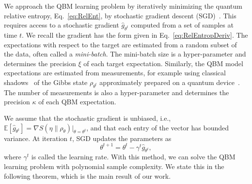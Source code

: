 \documentclass[
    aps,
    prx,
    onecolumn
]{revtex4-2}
\begin{document}
We approach the QBM learning problem by iteratively minimizing the quantum relative entropy,  Eq.~\eqref{eq:RelEnt}, by stochastic gradient descent (SGD)~\cite{Garrigos2023}. This requires access to a stochastic gradient $\hat{g}_{\theta^t}$ computed from a set of samples at time $t$. We recall the gradient has the form given in Eq.~\eqref{eq:RelEntropDeriv}. The expectations with respect to the target are estimated from a random subset of the data, often called a \emph{mini-batch}. The mini-batch size is a hyper-parameter and determines the precision $\xi$ of each target expectation. Similarly, the QBM model expectations are estimated from measurements, for example using classical shadows~\cite{Aaronson_2017, Huang_2021} of the Gibbs state $\rho_{\theta^t}$ approximately prepared on a quantum device~\cite{Coopmans_2023}. The number of measurements is also a hyper-parameter and determines the precision $\kappa$ of each QBM expectation.

We assume that the stochastic gradient is unbiased, i.e., $\mathbb{E}[\hat{g}_{\theta^t}] = \nabla S(\eta \|\rho_\theta)|_{\theta = \theta^t}$, and that each entry of the vector has bounded variance. At iteration $t$, SGD updates the parameters as 
\begin{equation}
\label{eq:sgd_update}
    \theta^{t+1} = \theta^{t} - \gamma^{t} \hat{g}_{\theta^{t}},
\end{equation} 
where $\gamma^t$ is called the learning rate. With this method, we can solve the QBM learning problem with polynomial sample complexity. We state this in the following theorem, which is the main result of our work. 
\end{document}
